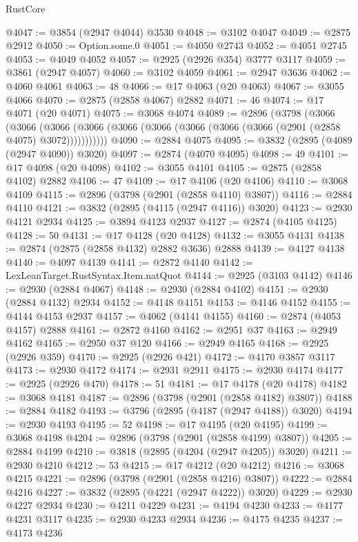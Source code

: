 \begin{lexlean}{RustCore}
\begin{coremodule}
@4047 := @3854 (@2947 @4044) @3530
@4048 := @3102 @4047
@4049 := @2875 @2912
@4050 := Option.some.{0}
@4051 := @4050 @2743
@4052 := @4051 @2745
@4053 := @4049 @4052
@4057 := @2925 (@2926 @354) @3777 @3117
@4059 := @3861 (@2947 @4057)
@4060 := @3102 @4059
@4061 := @2947 @3636
@4062 := @4060 @4061
@4063 := 48
@4066 := @17 @4063 (@20 @4063)
@4067 := @3055 @4066
@4070 := @2875 (@2858 @4067) @2882
@4071 := 46
@4074 := @17 @4071 (@20 @4071)
@4075 := @3068 @4074
@4089 := @2896
    (@3798
      (@3066
        (@3066
          (@3066 (@3066 (@3066 (@3066 (@3066 (@3066 (@3066 (@2901 (@2858 @4075) @3072)))))))))))
@4090 := @2884 @4075
@4095 := @3832 (@2895 (@4089 (@2947 @4090)) @3020)
@4097 := @2874 (@4070 @4095)
@4098 := 49
@4101 := @17 @4098 (@20 @4098)
@4102 := @3055 @4101
@4105 := @2875 (@2858 @4102) @2882
@4106 := 47
@4109 := @17 @4106 (@20 @4106)
@4110 := @3068 @4109
@4115 := @2896 (@3798 (@2901 (@2858 @4110) @3807))
@4116 := @2884 @4110
@4121 := @3832 (@2895 (@4115 (@2947 @4116)) @3020)
@4123 := @2930 @4121 @2934
@4125 := @3894 @4123 @2937
@4127 := @2874 (@4105 @4125)
@4128 := 50
@4131 := @17 @4128 (@20 @4128)
@4132 := @3055 @4131
@4138 := @2874 (@2875 (@2858 @4132) @2882 @3636) @2888
@4139 := @4127 @4138
@4140 := @4097 @4139
@4141 := @2872 @4140
@4142 := LexLeanTarget.RustSyntax.Item.natQuot
@4144 := @2925 (@3103 @4142)
@4146 := @2930 (@2884 @4067)
@4148 := @2930 (@2884 @4102)
@4151 := @2930 (@2884 @4132) @2934
@4152 := @4148 @4151
@4153 := @4146 @4152
@4155 := @4144 @4153 @2937
@4157 := @4062 (@4141 @4155)
@4160 := @2874 (@4053 @4157) @2888
@4161 := @2872 @4160
@4162 := @2951 @37
@4163 := @2949 @4162
@4165 := @2950 @37 @120
@4166 := @2949 @4165
@4168 := @2925 (@2926 @359)
@4170 := @2925 (@2926 @421)
@4172 := @4170 @3857 @3117
@4173 := @2930 @4172
@4174 := @2931 @2911
@4175 := @2930 @4174
@4177 := @2925 (@2926 @470)
@4178 := 51
@4181 := @17 @4178 (@20 @4178)
@4182 := @3068 @4181
@4187 := @2896 (@3798 (@2901 (@2858 @4182) @3807))
@4188 := @2884 @4182
@4193 := @3796 (@2895 (@4187 (@2947 @4188)) @3020)
@4194 := @2930 @4193
@4195 := 52
@4198 := @17 @4195 (@20 @4195)
@4199 := @3068 @4198
@4204 := @2896 (@3798 (@2901 (@2858 @4199) @3807))
@4205 := @2884 @4199
@4210 := @3818 (@2895 (@4204 (@2947 @4205)) @3020)
@4211 := @2930 @4210
@4212 := 53
@4215 := @17 @4212 (@20 @4212)
@4216 := @3068 @4215
@4221 := @2896 (@3798 (@2901 (@2858 @4216) @3807))
@4222 := @2884 @4216
@4227 := @3832 (@2895 (@4221 (@2947 @4222)) @3020)
@4229 := @2930 @4227 @2934
@4230 := @4211 @4229
@4231 := @4194 @4230
@4233 := @4177 @4231 @3117
@4235 := @2930 @4233 @2934
@4236 := @4175 @4235
@4237 := @4173 @4236

\end{coremodule}
\end{lexlean}
